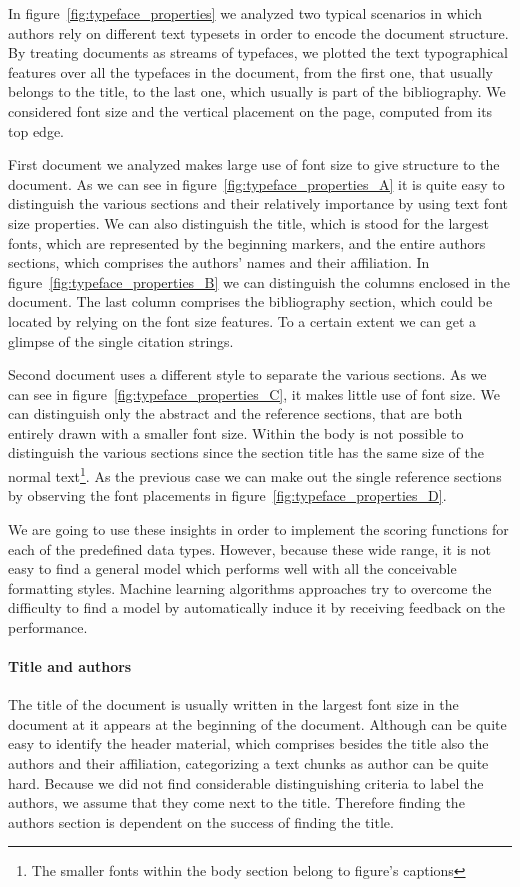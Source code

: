 In figure~\ref{fig:typeface_properties} we analyzed two typical scenarios in which authors rely on different text typesets in order to encode the document structure. By treating documents as streams of typefaces, we plotted the text typographical features over all the typefaces in the document, from the first one, that usually belongs to the title, to the last one, which usually is part of the bibliography. We considered font size and the vertical placement on the page, computed from its top edge.

First document we analyzed makes large use of font size to give structure to the document. As we can see in figure~\ref{fig:typeface_properties_A} it is quite easy to distinguish the various sections and their relatively importance by using text font size properties. We can also distinguish the title, which is stood for the largest fonts, which are represented by the beginning markers, and the entire authors sections, which comprises the authors' names and their affiliation. In figure~\ref{fig:typeface_properties_B} we can distinguish the columns enclosed in the document. The last column comprises the bibliography section, which could be located by relying on the font size features. To a certain extent we can get a glimpse of the single citation strings.

Second document uses a different style to separate the various sections. As we can see in figure~\ref{fig:typeface_properties_C}, it makes little use of font size. We can distinguish only the abstract and the reference sections, that are both entirely drawn with a smaller font size. Within the body is not possible to distinguish the various sections since the section title has the same size of the normal text\footnote{The smaller fonts within the body section belong to figure's captions}. As the previous case we can make out the single reference sections by observing the font placements in figure~\ref{fig:typeface_properties_D}.

We are going to use these insights in order to implement the scoring functions for each of the predefined data types. However, because these wide range, it is not easy to find a general model which performs well with all the conceivable formatting styles. Machine learning algorithms approaches try to overcome the difficulty to find a model by automatically induce it by receiving feedback on the performance.

\paragraph{Title and authors} The title of the document is usually written in the largest font size in the document at it appears at the beginning of the document. Although can be quite easy to identify the header material, which comprises besides the title also the authors and their affiliation, categorizing a text chunks as author can be quite hard. Because we did not find considerable distinguishing criteria to label the authors, we assume that they come next to the title. Therefore finding the authors section is dependent on the success of finding the title.

